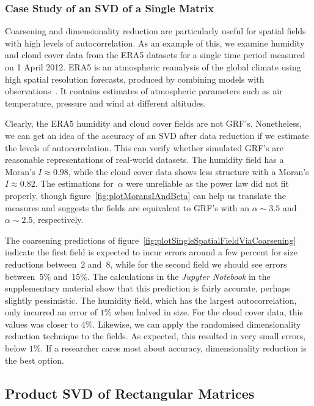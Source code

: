\documentclass[ijgi,article,submit,moreauthors,pdftex,10pt,a4paper]{Definitions/mdpi}
\begin{document}
\subsubsection{Case Study of an SVD of a Single Matrix}
\label{sec:Results/Case Study of an SVD of a Single Matrix} %

Coarsening and dimensionality reduction are particularly useful for spatial fields with high levels of autocorrelation. As an example of this, we examine humidity and cloud cover data from the ERA5 datasets for a single time period measured on 1 April 2012. ERA5 is an atmospheric reanalysis of the global climate using high spatial resolution forecasts, produced by combining models with observations~\cite{Dee2011}. It contains estimates of atmospheric parameters such as air temperature, pressure and wind at different altitudes.

Clearly, the ERA5 humidity and cloud cover fields are not GRF's. Nonetheless, we can get an idea of the accuracy of an SVD after data reduction if we estimate the levels of autocorrelation. This can verify whether simulated GRF's are reasonable representations of real-world datasets. The humidity field has a Moran's $I \approx 0.98$, while the cloud cover data shows less structure with a Moran's $I \approx 0.82$. The estimations for~$\alpha$ were unreliable as the power law did not fit properly, though figure~\ref{fig:plotMoransIAndBeta} can help us translate the measures and suggests the fields are equivalent to GRF's with an $\alpha \sim 3.5$ and $\alpha \sim 2.5$, respectively.

The coarsening predictions of figure~\ref{fig:plotSingleSpatialFieldViaCoarsening} indicate the first field is expected to incur errors around a few percent for size reductions between~$2$ and~$8$, while for the second field we should see errors between~$5\%$ and~$15\%$. The calculations in the \textit{Jupyter Notebook} in the supplementary material show that this prediction is fairly accurate, perhaps slightly pessimistic. The humidity field, which has the largest autocorrelation, only incurred an error of $1\%$ when halved in size. For the cloud cover data, this values was closer to $4\%$. Likewise, we can apply the randomised dimensionality reduction technique to the fields. As expected, this resulted in very small errors, below $1\%$. If a researcher cares most about accuracy, dimensionality reduction is the best option.

\subsection{Product SVD of Rectangular Matrices}
\label{sec:Results/Product SVD of Rectangular Matrices}
\end{document}
